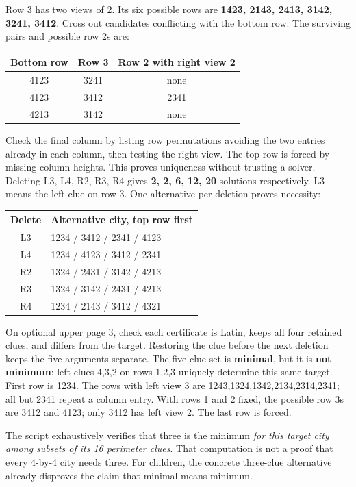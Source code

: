 \documentclass[11pt]{article}
\begin{document}
Row 3 has two views of 2. Its six possible rows are \textbf{1423, 2143, 2413, 3142, 3241, 3412}. Cross out candidates conflicting with the bottom row. The surviving pairs and possible row 2s are:
\begin{center}\renewcommand{\arraystretch}{1.3}\begin{tabular}{c|c|c}Bottom row&Row 3&Row 2 with right view 2\\\hline4123&3241&none\\4123&3412&2341\\4213&3142&none\end{tabular}\end{center}
Check the final column by listing row permutations avoiding the two entries already in each column, then testing the right view. The top row is forced by missing column heights. This proves uniqueness without trusting a solver.
Deleting L3, L4, R2, R3, R4 gives \textbf{2, 2, 6, 12, 20} solutions respectively. L3 means the left clue on row 3. One alternative per deletion proves necessity:
\begin{center}\small\renewcommand{\arraystretch}{1.35}\begin{tabular}{c|l}Delete&Alternative city, top row first\\\hline L3&1234 / 3412 / 2341 / 4123\\L4&1234 / 4123 / 3412 / 2341\\R2&1324 / 2431 / 3142 / 4213\\R3&1324 / 3142 / 2431 / 4213\\R4&1234 / 2143 / 3412 / 4321\end{tabular}\end{center}
On optional upper page 3, check each certificate is Latin, keeps all four retained clues, and differs from the target. Restoring the clue before the next deletion keeps the five arguments separate. The five-clue set is \textbf{minimal}, but it is \textbf{not minimum}: left clues 4,3,2 on rows 1,2,3 uniquely determine this same target. First row is 1234. The rows with left view 3 are 1243,1324,1342,2134,2314,2341; all but 2341 repeat a column entry. With rows 1 and 2 fixed, the possible row 3s are 3412 and 4123; only 3412 has left view 2. The last row is forced.

The script exhaustively verifies that three is the minimum \emph{for this target city among subsets of its 16 perimeter clues}. That computation is not a proof that every 4-by-4 city needs three. For children, the concrete three-clue alternative already disproves the claim that minimal means minimum.
\end{document}
